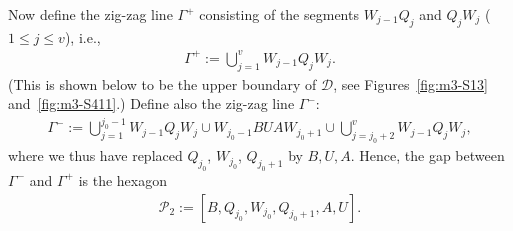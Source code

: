 \documentclass[11pt,reqno,tbtags,a4paper]{amsart}
\numberwithin{equation}{section}
\renewcommand\le{\leq}
\renewcommand\leq{\leqslant}
\theoremstyle{plain}%
\theoremstyle{definition}
\theoremstyle{remark}
\newcommand\gG{\Gamma}
\newcommand\cD{\mathcal D}
\newcommand\cP{\mathcal P}
\newcommand\0{{\boldsymbol 0}}
\newcommand\1{{\boldsymbol 1}}
\begin{document}
Now define the zig-zag line $\gG^+$
consisting of the segments
$W_{j-1}Q_j$  and 
$Q_jW_{j}$ ($1\le j\le v$), i.e.,
\begin{align}\label{maj34}
%
\gG^+:=\bigcup_{j=1}^v W_{j-1}Q_jW_{j}.
\end{align}
(This is shown below to be the upper boundary of $\cD$, see
Figures~\ref{fig:m3-S13} and~\ref{fig:m3-S411}.)
Define also
the zig-zag line $\gG^-$:
\begin{align}\label{maj35}
\gG^-:=\bigcup_{j=1}^{j_0-1} W_{j-1}Q_jW_{j}
\cup
W_{j_0-1}BUAW_{j_0+1}
\cup
\bigcup_{j=j_0+2}^{v} W_{j-1}Q_jW_{j},
%
%
%
\end{align}
where we thus have replaced $Q_{j_0}$, $W_{j_0}$, $Q_{j_0+1}$
by $B, U, A$. Hence,
the gap between $\gG^-$ and $\gG^+$ is 
the hexagon
\begin{align}\label{maj36}
  \cP_2:=[B,Q_{j_0},W_{j_0},Q_{j_0+1},A,U].
\end{align}
\end{document}
